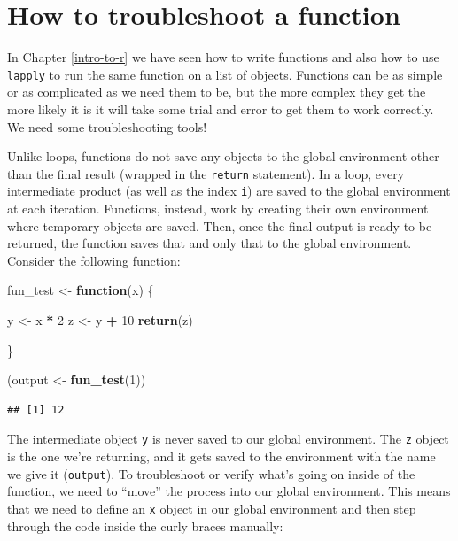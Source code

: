 \documentclass[
]{book}
\newenvironment{Shaded}{\begin{snugshade}}{\end{snugshade}}
\newcommand{\ControlFlowTok}[1]{\textcolor[rgb]{0.13,0.29,0.53}{\textbf{#1}}}
\newcommand{\DecValTok}[1]{\textcolor[rgb]{0.00,0.00,0.81}{#1}}
\newcommand{\FunctionTok}[1]{\textcolor[rgb]{0.13,0.29,0.53}{\textbf{#1}}}
\newcommand{\NormalTok}[1]{#1}
\newcommand{\OtherTok}[1]{\textcolor[rgb]{0.56,0.35,0.01}{#1}}
\newcommand{\SpecialCharTok}[1]{\textcolor[rgb]{0.81,0.36,0.00}{\textbf{#1}}}
\begin{document}
\hypertarget{how-to-troubleshoot-a-function}{%
\section{How to troubleshoot a function}\label{how-to-troubleshoot-a-function}}

In Chapter \ref{intro-to-r} we have seen how to write functions and also how to
use \texttt{lapply} to run the same function on a list of objects. Functions can be
as simple or as complicated as we need them to be, but the more complex they get
the more likely it is it will take some trial and error to get them to work
correctly. We need some troubleshooting tools!

Unlike loops, functions do not save any objects to the global environment other
than the final result (wrapped in the \texttt{return} statement). In a loop, every
intermediate product (as well as the index \texttt{i}) are saved to the global
environment at each iteration. Functions, instead, work by creating their own
environment where temporary objects are saved. Then, once the final output is
ready to be returned, the function saves that and only that to the global
environment. Consider the following function:

\begin{Shaded}
\begin{Highlighting}[]
\NormalTok{fun\_test }\OtherTok{\textless{}{-}} \ControlFlowTok{function}\NormalTok{(x) \{}
  
\NormalTok{  y }\OtherTok{\textless{}{-}}\NormalTok{ x }\SpecialCharTok{*} \DecValTok{2}
\NormalTok{  z }\OtherTok{\textless{}{-}}\NormalTok{ y }\SpecialCharTok{+} \DecValTok{10}
  \FunctionTok{return}\NormalTok{(z)}

\NormalTok{\}}

\NormalTok{(output }\OtherTok{\textless{}{-}} \FunctionTok{fun\_test}\NormalTok{(}\DecValTok{1}\NormalTok{))}
\end{Highlighting}
\end{Shaded}

\begin{verbatim}
## [1] 12
\end{verbatim}

The intermediate object \texttt{y} is never saved to our global environment. The \texttt{z}
object is the one we're returning, and it gets saved to the environment with the
name we give it (\texttt{output}). To troubleshoot or verify what's going on inside of
the function, we need to ``move'' the process into our global environment. This
means that we need to define an \texttt{x} object in our global environment and then
step through the code inside the curly braces manually:
\end{document}
